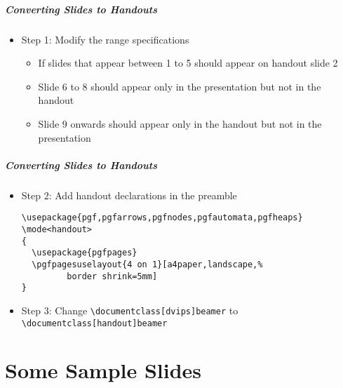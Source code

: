 \documentclass[handout]{beamer}
\begin{document}
\begin{frame}[fragile]
\frametitle{Converting Slides to Handouts}

\begin{itemize}
\item Step 1: Modify the range specifications

\begin{itemize}
\item If slides that appear between 1 to 5 should appear on handout slide 2 
	
{\tt <1-5|handout:2>}

\item Slide 6 to 8 should appear only in the presentation but not in the handout


{\tt <6-8|handout:0>}

\item Slide 9 onwards should appear only in the handout but not in the presentation


{\tt <0|handout:9->}
\end{itemize}

\end{itemize}

\end{frame}


\begin{frame}[fragile]
\frametitle{Converting Slides to Handouts}

\begin{itemize}
\item Step 2: Add handout declarations in the preamble

{\small
\begin{verbatim}
\usepackage{pgf,pgfarrows,pgfnodes,pgfautomata,pgfheaps}
\mode<handout>
{
  \usepackage{pgfpages}	
  \pgfpagesuselayout{4 on 1}[a4paper,landscape,%
         border shrink=5mm]
}
\end{verbatim}
}

\item Step 3: Change {\tt \textbackslash documentclass[dvips]{beamer}}
	to
{\tt \textbackslash documentclass[handout]{beamer}}
\end{itemize}

\end{frame}



\part{Some Sample Slides}
\frame[plain]{\partpage}
\end{document}

